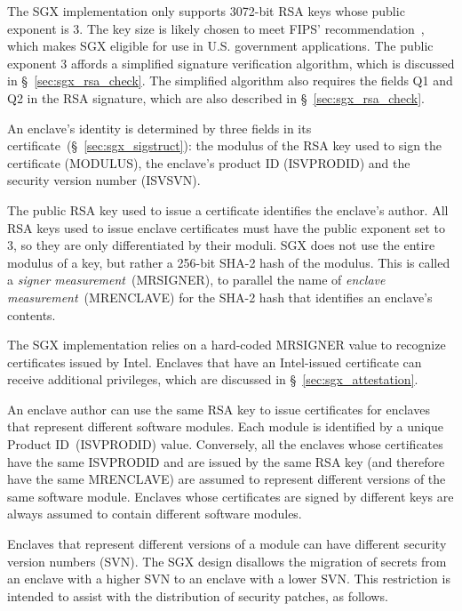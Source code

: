 The SGX implementation only supports 3072-bit RSA keys whose public exponent is
3. The key size is likely chosen to meet FIPS'
recommendation~\cite{fips2012keysize}, which makes SGX eligible for use in U.S.
government applications. The public exponent 3 affords a simplified signature
verification algorithm, which is discussed in \S~\ref{sec:sgx_rsa_check}. The
simplified algorithm also requires the fields Q1 and Q2 in the RSA signature,
which are also described in \S~\ref{sec:sgx_rsa_check}.


\label{sec:sgx_certificate_identity}

An enclave's identity is determined by three fields in its
certificate~(\S~\ref{sec:sgx_sigstruct}): the modulus of the RSA key used to
sign the certificate (MODULUS), the enclave's product ID (ISVPRODID) and the
security version number (ISVSVN).


The public RSA key used to issue a certificate identifies the enclave's author.
All RSA keys used to issue enclave certificates must have the public exponent
set to 3, so they are only differentiated by their moduli. SGX does not use the
entire modulus of a key, but rather a 256-bit SHA-2 hash of the modulus. This
is called a \textit{signer measurement}~(MRSIGNER), to parallel the name of
\textit{enclave measurement}~(MRENCLAVE) for the SHA-2 hash that identifies an
enclave's contents.

The SGX implementation relies on a hard-coded MRSIGNER value to recognize
certificates issued by Intel. Enclaves that have an Intel-issued certificate
can receive additional privileges, which are discussed in
\S~\ref{sec:sgx_attestation}.

An enclave author can use the same RSA key to issue certificates for enclaves
that represent different software modules. Each module is identified by a
unique Product ID~(ISVPRODID) value. Conversely, all the enclaves whose
certificates have the same ISVPRODID and are issued by the same RSA key
(and therefore have the same MRENCLAVE) are assumed to represent different
versions of the same software module. Enclaves whose certificates are signed
by different keys are always assumed to contain different software modules.


Enclaves that represent different versions of a module can have different
security version numbers (SVN). The SGX design disallows the migration of
secrets from an enclave with a higher SVN to an enclave with a lower SVN. This
restriction is intended to assist with the distribution of security patches,
as follows.

